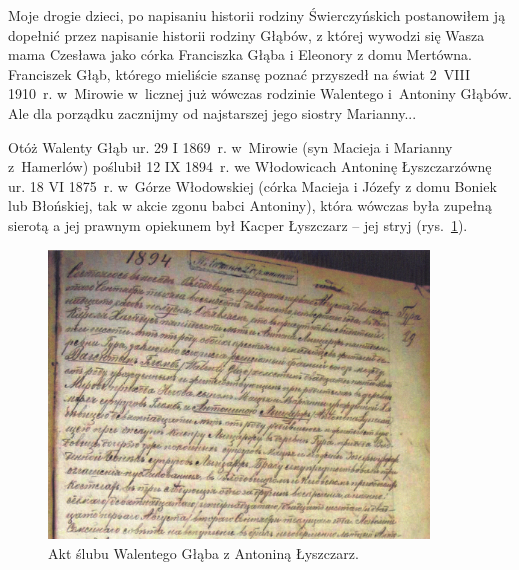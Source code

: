 Moje drogie dzieci, po napisaniu historii rodziny Świerczyńskich postanowiłem ją dopełnić przez napisanie historii rodziny Głąbów, z której wywodzi się Wasza mama Czesława jako córka Franciszka Głąba i Eleonory z domu Mertówna. Franciszek Głąb, którego mieliście szansę poznać przyszedł na świat 2~VIII 1910~r. w~Mirowie w~licznej już wówczas rodzinie Walentego i~Antoniny Głąbów. Ale dla porządku zacznijmy od najstarszej jego siostry Marianny...

Otóż Walenty Głąb ur. 29 I 1869~r. w~Mirowie (syn Macieja i Marianny z~Hamerlów) poślubił 12 IX 1894~r. we Włodowicach Antoninę Łyszczarzównę ur. 18 VI 1875~r. w~Górze Włodowskiej (córka Macieja i Józefy z domu Boniek lub Błońskiej, tak w akcie zgonu babci Antoniny), która wówczas była zupełną sierotą a jej prawnym opiekunem był Kacper Łyszczarz -- jej stryj (rys.~\ref{rys:akt_slubu_walentego_glaba_i_antoniny_lyszczarz}).

\begin{figure}[!h]
\begin{center}
\includegraphics[width=0.9\textwidth]{zdjecia/akt_slubu_walentego_glaba_i_antoniny_lyszczarz.jpg}
\caption{Akt ślubu Walentego Głąba z Antoniną Łyszczarz.}
\label{rys:akt_slubu_walentego_glaba_i_antoniny_lyszczarz}
\end{center}
\end{figure}
